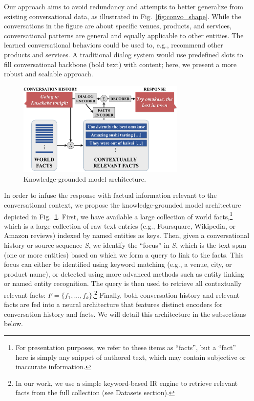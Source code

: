 \documentclass[letterpaper]{article}
\begin{document}
Our approach aims to avoid redundancy and attempts to better generalize from existing conversational data, as illustrated in Fig.~\ref{fig:convo_shape}.
While the conversations in the figure are about specific venues, products, and services, conversational patterns are general and equally applicable to other entities.
The learned conversational behaviors could be used to, e.g., recommend other products and services. 
A traditional dialog system would use predefined slots to fill conversational backbone (bold text) with content; here, we present a more robust and scalable approach.

\begin{figure}
\centering
\includegraphics[width=8.3cm]{facts-emb}
\caption{Knowledge-grounded model architecture.}
\label{fig:arch}
\end{figure}

In order to infuse the response with factual information relevant to the conversational context, we propose the knowledge-grounded model architecture
depicted in Fig.~\ref{fig:arch}. 
First, we have available a large collection of world facts,\footnote{For presentation purposes, we refer to these items as ``facts'', but a ``fact'' here is simply any snippet of authored text, which may contain subjective or inaccurate information.} which is a large collection of raw text entries (e.g., Foursquare, Wikipedia, or Amazon reviews) indexed by named entities as keys.
Then, given a conversational history or source sequence $S$, we identify the ``focus'' in $S$, which is the text span (one or more entities) based on which we form a query to link to the facts.
This focus can either be identified using keyword matching (e.g., a venue, city, or product name), or detected using more advanced methods such as entity linking or named entity recognition. 
The query
is then used to retrieve all contextually relevant facts: \mbox{$F=\{f_1,...,f_{k}\}$}.\footnote{In our work, we use a simple keyword-based IR engine to retrieve relevant facts from the full collection (see Datasets section).} 
Finally, both conversation history and relevant facts are fed into a neural architecture
that features distinct encoders for conversation history and facts. We will detail this architecture in the subsections below.
\end{document}

